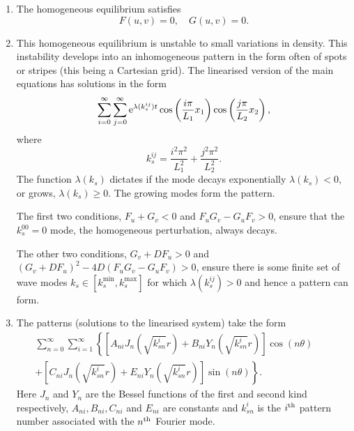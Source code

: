 \documentclass[a4paper, 12pt]{article}
\begin{document}
\begin{enumerate}[label={\bf \arabic{*}.\;}, ref={\arabic{*}},itemsep=3ex, left=0ex]
{\begin{enumerate}[label=(\alph*)]
        \end{enumerate}
      }
      {
        \begin{enumerate}[label=(\alph*)]
          \item The homogeneous equilibrium satisfies
            \begin{equation}
              F(u,v) =0,\quad G(u,v) = 0.
            \end{equation}

          \item{
              This homogeneous equilibrium is unstable to small variations in density. This instability develops into an inhomogeneous pattern in the form often of spots or stripes (this being a Cartesian grid). The linearised version of the main equations has solutions in the form
              \begin{equation}
                \sum_{i=0}^{\infty}\sum_{j=0}^{\infty}\mathrm{e}^{\lambda(k_s^{ij}) t}\cos\left(\frac{i\pi}{L_1}x_1\right)\cos\left(\frac{j\pi}{L_2}x_2\right),
              \end{equation}
              where
              \begin{equation}
                k_s^{ij} = \frac{i^2\pi^2}{L_1^2}+\frac{j^2\pi^2}{L_2^2}.
              \end{equation}
              The function $\lambda(k_s)$ dictates if the mode decays exponentially $\lambda(k_s)<0,$ or grows, $\lambda(k_s)\geq 0$. The growing modes form the pattern.

              The first two conditions, $F_u +G_v <0$ and $F_uG_v  -G_uF_v> 0$, ensure that the $k_s^{00}=0$ mode, the homogeneous perturbation, always decays.

              The other two conditions, $G_v + DF_u>0$ and $(G_v+ D F_u)^2 - 4 D (F_uG_v  -G_uF_v)>0$, ensure there is some finite set of wave modes $k_s\in[k_s^{\min},k_s^{\max}]$ for which $\lambda(k_s^{ij})>0$ and hence a pattern can form.
            }
          \item{
              The patterns (solutions to the linearised system) take the form
              \begin{align}
                \sum_{n=0}^{\infty}\sum_{i=1}^{\infty}\left\{\left[A_{ni}J_n(\sqrt{k_{sn}^{i}}r)  + B_{ni}Y_n(\sqrt{k_{sn}^{i}}r) \right]\cos(n \theta) \right. \qquad \nonumber\\ + \left.\left[C_{ni}J_n(\sqrt{k_{sn}^{i}}r)  + E_{ni}Y_n(\sqrt{k_{sn}^{i}}r) \right]\sin(n\theta)\right\}.
              \end{align}
              Here $J_n$ and $Y_n$ are the Bessel functions of the first and second kind respectively, $A_{ni}, B_{ni}, C_{ni}$ and $E_{ni}$ are constants and $k_{sn}^{i}$ is the $i^{\rm th}$ pattern number associated with the $n^{\rm th}$ Fourier mode.
            }
        \end{enumerate}

}
\end{enumerate}
\end{document}
